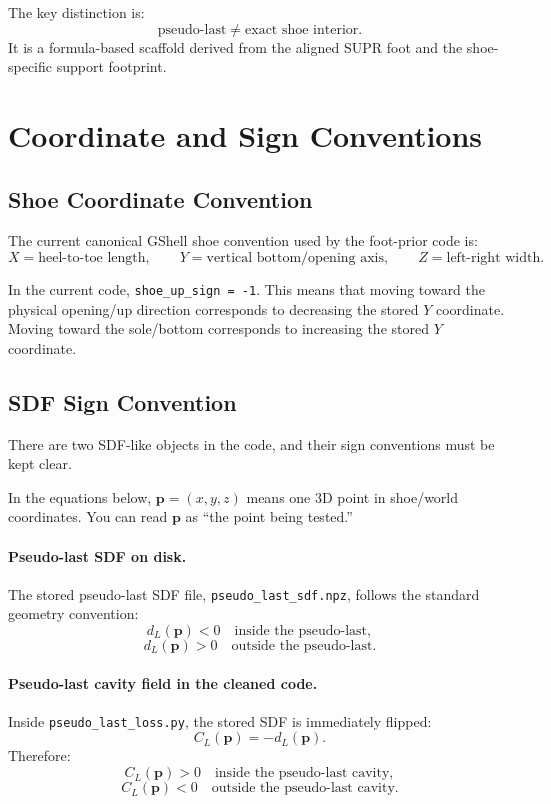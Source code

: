 \documentclass[11pt]{article}
\newcommand{\pt}{\mathbf{p}}
\begin{document}
The key distinction is:
\[
\text{pseudo-last} \neq \text{exact shoe interior}.
\]
It is a formula-based scaffold derived from the aligned SUPR foot and the
shoe-specific support footprint.

\section{Coordinate and Sign Conventions}

\subsection{Shoe Coordinate Convention}

The current canonical GShell shoe convention used by the foot-prior code is:
\[
X = \text{heel-to-toe length}, \qquad
Y = \text{vertical bottom/opening axis}, \qquad
Z = \text{left-right width}.
\]

In the current code, \texttt{shoe\_up\_sign = -1}.  This means that moving
toward the physical opening/up direction corresponds to decreasing the stored
\(Y\) coordinate.  Moving toward the sole/bottom corresponds to increasing the
stored \(Y\) coordinate.

\subsection{SDF Sign Convention}

There are two SDF-like objects in the code, and their sign conventions must be
kept clear.

In the equations below, \(\pt=(x,y,z)\) means one 3D point in shoe/world
coordinates.  You can read \(\pt\) as ``the point being tested.''

\paragraph{Pseudo-last SDF on disk.}
The stored pseudo-last SDF file, \texttt{pseudo\_last\_sdf.npz}, follows the
standard geometry convention:
\[
d_L(\pt) < 0 \quad \text{inside the pseudo-last},
\]
\[
d_L(\pt) > 0 \quad \text{outside the pseudo-last}.
\]

\paragraph{Pseudo-last cavity field in the cleaned code.}
Inside \texttt{pseudo\_last\_loss.py}, the stored SDF is immediately flipped:
\[
C_L(\pt) = -d_L(\pt).
\]
Therefore:
\[
C_L(\pt) > 0 \quad \text{inside the pseudo-last cavity},
\]
\[
C_L(\pt) < 0 \quad \text{outside the pseudo-last cavity}.
\]
\end{document}
